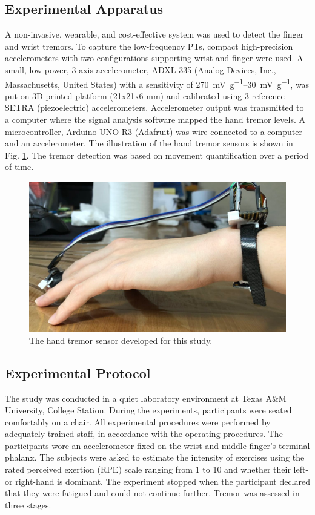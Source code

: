 \documentclass[conference, a4paper]{IEEEtran}
\begin{document}
\subsection{Experimental Apparatus}
%
A non-invasive, wearable, and cost-effective system was used to detect the finger and wrist tremors. To capture the low-frequency PTs, compact high-precision accelerometers with two configurations supporting wrist and finger were used. A small, low-power, 3-axis accelerometer, ADXL 335 (Analog Devices, Inc., Massachusetts, United States) with a sensitivity of \SIrange{270}{30} {\milli \volt \per \g},  was put on 3D printed platform (21x21x6 mm) and calibrated using 3 reference SETRA (piezoelectric) accelerometers. Accelerometer output was transmitted to a computer where the signal analysis software mapped the hand tremor levels. A microcontroller, Arduino UNO R3 (Adafruit) was wire connected to a computer and an accelerometer. The illustration of the hand tremor sensors is shown in Fig. \ref{fig:sensor}. The tremor detection was based on movement quantification over a period of time.
% 
\begin{figure}[t!]
  \centering
  \includegraphics[width=.9\linewidth]{sensor.png}
  \caption{The hand tremor sensor developed for this study.}
  \label{fig:sensor}
\end{figure}
%
\subsection{Experimental Protocol}
%
The study was conducted in a quiet laboratory environment at Texas A\&M University, College Station. During the experiments, participants were seated comfortably on a chair. All experimental procedures were performed by adequately trained staff, in accordance with the operating procedures. The participants wore an accelerometer fixed on the wrist and middle finger's terminal phalanx. The subjects were asked to estimate the intensity of exercises using the rated perceived exertion (RPE) scale ranging from 1 to 10 and whether their left- or right-hand is dominant. The experiment stopped when the participant declared that they were fatigued and could not continue further. Tremor was assessed in three stages.
%
\end{document}
